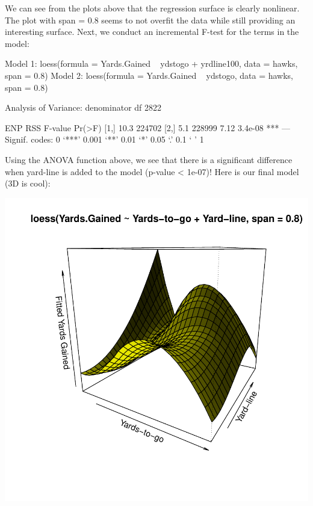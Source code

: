 \documentclass{article}
\begin{document}
\newpage

We can see from the plots above that the regression surface is clearly nonlinear. The plot with span = 0.8 seems to not overfit the data while still providing an interesting surface. Next, we conduct an incremental F-test for the terms in the model:

\begin{Schunk}
\begin{Soutput}
Model 1: loess(formula = Yards.Gained ~ ydstogo + yrdline100, data = hawks, span = 0.8)
Model 2: loess(formula = Yards.Gained ~ ydstogo, data = hawks, span = 0.8)

Analysis of Variance:   denominator df 2822

      ENP    RSS F-value  Pr(>F)    
[1,] 10.3 224702                    
[2,]  5.1 228999    7.12 3.4e-08 ***
---
Signif. codes:  0 ‘***’ 0.001 ‘**’ 0.01 ‘*’ 0.05 ‘.’ 0.1 ‘ ’ 1
\end{Soutput}
\end{Schunk}

Using the ANOVA function above, we see that there is a significant difference when yard-line is added to the model (p-value < 1e-07)! Here is our final model (3D is cool):

\includegraphics{project4-015}

\newpage
\end{document}
